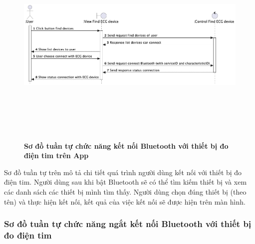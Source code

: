   \begin{figure}[H]
        \centering
        \includegraphics[width=16cm,height=10cm]{Images/mobile_app/connect_with_device.png}
        \caption[Sơ đồ tuần tự chức năng kết nối Bluetooth với thiết bị đo điện tim trên App]{\bfseries \fontsize{12pt}{0pt}
        \selectfont Sơ đồ tuần tự chức năng kết nối Bluetooth với thiết bị đo điện tim trên App}
        \label{connect_with_device} %
  \end{figure}

  Sơ đồ tuần tự trên mô tả chi tiết quá trình người dùng kết nối với thiết bị đo điện tim. Người dùng sau khi bật Bluetooth
  sẽ có thể tìm kiếm thiết bị và xem các danh sách các thiết bị mình tìm thấy. Người dùng chọn đúng thiết bị (theo tên) 
  và thực hiện kết nối, kết quả của việc kết nối sẽ được hiện trên màn hình.

\subsubsection{Sơ đồ tuần tự chức năng ngắt kết nối Bluetooth với thiết bị đo điện tim}

